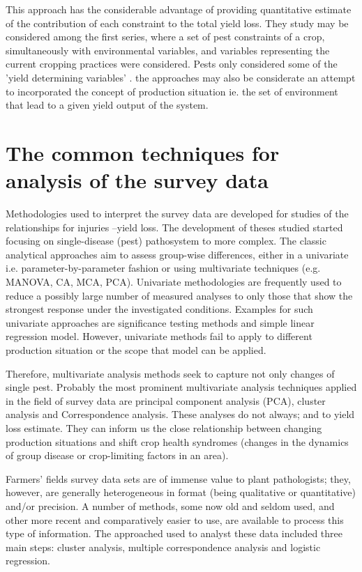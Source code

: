 This approach has the considerable advantage of providing quantitative estimate of the contribution of each constraint to the total yield loss. They study may be considered among the first series, where a set of pest constraints of a crop, simultaneously with environmental variables, and variables representing the current cropping practices were considered. Pests only considered some of the 'yield determining variables' . the approaches may also be considerate an attempt to incorporated the concept of production situation ie. the set of environment that lead to a given yield output of the system. 

\section*{The common techniques for analysis of the survey data}

Methodologies used to interpret the survey data are developed for studies of the relationships for injuries –yield loss. The development of theses studied started focusing on single-disease (pest) pathosystem to more complex. The classic analytical approaches aim to assess group-wise differences, either in a univariate i.e. parameter-by-parameter fashion or using multivariate techniques (e.g. MANOVA, CA, MCA, PCA). Univariate methodologies are frequently used to reduce a possibly large number of measured analyses to only those that show the strongest response under the investigated conditions. Examples for such univariate approaches are significance testing methods and simple linear regression model. However, univariate methods fail to apply to different production situation or the scope that model can be applied.

Therefore, multivariate analysis methods seek to capture not only changes of single pest. Probably the most prominent multivariate analysis techniques applied in the field of survey data are principal component analysis (PCA), cluster analysis and Correspondence analysis. These analyses do not always; and to yield loss estimate. They can inform us the close relationship between changing production situations and shift crop health syndromes (changes in the dynamics of group disease or crop-limiting factors in an area). 

Farmers’ fields survey data sets are of immense value to plant pathologists; they, however, are generally heterogeneous in format (being qualitative or quantitative) and/or precision. A number of methods, some now old and seldom used, and other more recent and comparatively easier to use, are available to process this type of information. The approached used to analyst these data included three main steps: cluster analysis, multiple correspondence analysis and logistic regression.

